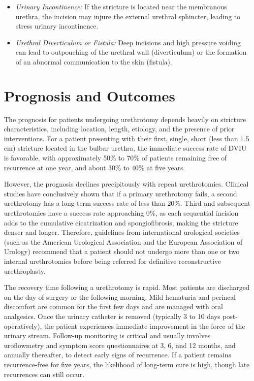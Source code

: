 \begin{itemize}
\begin{itemize}
    \item \textit{Urinary Incontinence:} If the stricture is located near the membranous urethra, the incision may injure the external urethral sphincter, leading to stress urinary incontinence.
    \item \textit{Urethral Diverticulum or Fistula:} Deep incisions and high pressure voiding can lead to outpouching of the urethral wall (diverticulum) or the formation of an abnormal communication to the skin (fistula).
  \end{itemize}
\end{itemize}

\section*{Prognosis and Outcomes}
The prognosis for patients undergoing urethrotomy depends heavily on stricture characteristics, including location, length, etiology, and the presence of prior interventions. For a patient presenting with their first, single, short (less than 1.5 cm) stricture located in the bulbar urethra, the immediate success rate of DVIU is favorable, with approximately 50\% to 70\% of patients remaining free of recurrence at one year, and about 30\% to 40\% at five years.

However, the prognosis declines precipitously with repeat urethrotomies. Clinical studies have conclusively shown that if a primary urethrotomy fails, a second urethrotomy has a long-term success rate of less than 20\%. Third and subsequent urethrotomies have a success rate approaching 0\%, as each sequential incision adds to the cumulative cicatrization and spongiofibrosis, making the stricture denser and longer. Therefore, guidelines from international urological societies (such as the American Urological Association and the European Association of Urology) recommend that a patient should not undergo more than one or two internal urethrotomies before being referred for definitive reconstructive urethroplasty.

The recovery time following a urethrotomy is rapid. Most patients are discharged on the day of surgery or the following morning. Mild hematuria and perineal discomfort are common for the first few days and are managed with oral analgesics. Once the urinary catheter is removed (typically 3 to 10 days post-operatively), the patient experiences immediate improvement in the force of the urinary stream. Follow-up monitoring is critical and usually involves uroflowmetry and symptom score questionnaires at 3, 6, and 12 months, and annually thereafter, to detect early signs of recurrence. If a patient remains recurrence-free for five years, the likelihood of long-term cure is high, though late recurrences can still occur.


